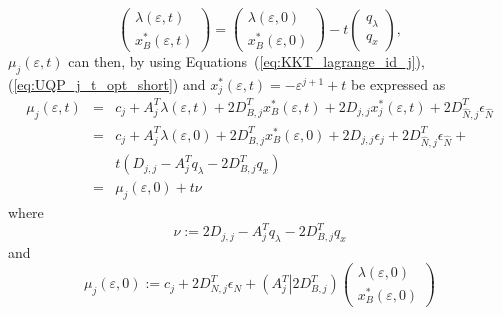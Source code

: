 \documentclass[a4paper]{article}
\begin{document}
\begin{equation}
\label{eq:UQP_j_t_opt_short}
\left(\begin{array}{c}
         \lambda\left(\varepsilon, t\right) \\
	 \hline
	 x_{B}^{*}\left(\varepsilon, t\right)
       \end{array}
\right)
=
\left(\begin{array}{c}
        \lambda\left(\varepsilon, 0\right) \\
	\hline
	x_{B}^{*}\left(\varepsilon, 0\right)
      \end{array}
\right)
-t
\left(\begin{array}{c}
         q_{\lambda} \\
	 \hline
	 q_{x}
       \end{array}
\right),
\end{equation}
$\mu_{j}\left(\varepsilon, t\right)$ can then, by using
Equations~(\ref{eq:KKT_lagrange_id_j}),(\ref{eq:UQP_j_t_opt_short}) and 
$x_{j}^{*}\left(\varepsilon, t\right)= -\varepsilon^{j+1} + t$ be
expressed as
\begin{eqnarray}
\label{eq:mu_j_eps_t}
\mu_{j}\left(\varepsilon, t\right) & = & c_{j} +
  A_{j}^{T}\lambda\left(\varepsilon, t\right)
  + 2D_{B,j}^{T}x_{B}^{*}\left(\varepsilon, t\right) +
  2D_{j,j}x_{j}^{*}\left(\varepsilon, t\right)
  + 2D_{\hat{N}, j}^{T}\epsilon_{\hat{N}} \nonumber \\
  & = & c_{j} + A_{j}^{T}\lambda\left(\varepsilon, 0\right)
  + 2D_{B,j}^{T}x_{B}^{*}\left(\varepsilon, 0\right) +
  2D_{j,j}\epsilon_{j}
  + 2D_{\hat{N}, j}^{T}\epsilon_{\hat{N}} + \nonumber \\
  & & t\left(D_{j,j} - A_{j}^{T}q_{\lambda} - 2D_{B,j}^{T}q_{x}
  \right) \\
  & = & \mu_{j}\left(\varepsilon, 0\right) + t\nu
  \nonumber   
\end{eqnarray}
where
\begin{equation}
\label{def:nu}
\nu := 2D_{j,j} - A_{j}^{T}q_{\lambda} - 2D_{B,j}^{T}q_{x}
\end{equation}
and
\begin{equation}
\mu_{j}\left(\varepsilon, 0\right) :=
c_{j} + 2D_{N, j}^{T}\epsilon_{N} +
\left(A_{j}^{T} \left|\right. 2D_{B, j}^{T} \right)
\left(\begin{array}{c}
        \lambda\left(\varepsilon, 0\right) \\
	\hline
	x_{B}^{*}\left(\varepsilon, 0\right)
       \end{array}
\right) 
\end{equation}
\end{document}
